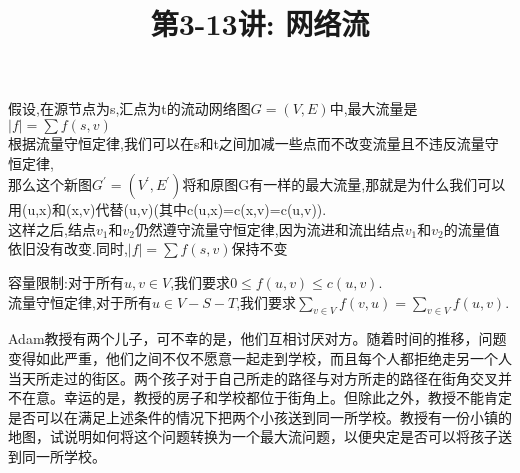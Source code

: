 \documentclass[a4paper, justified]{tufte-handout}
\title{第3-13讲: 网络流}
\date{\zhtoday} %
\begin{document}
\maketitle
\noplagiarism %
\begin{abstract}
\end{abstract}
\beginrequired

\begin{problem}[TC 26.1-1]
\end{problem}

\begin{solution}
  假设,在源节点为s,汇点为t的流动网络图$G=(V,E)$中,最大流量是$|f|=\sum f(s,v)$\\

  根据流量守恒定律,我们可以在s和t之间加减一些点而不改变流量且不违反流量守恒定律,\\
  那么这个新图$G^{'}=(V^{'},E^{'})$将和原图G有一样的最大流量,那就是为什么我们可以用(u,x)和(x,v)代替(u,v)(其中c(u,x)=c(x,v)=c(u,v)).\\
  这样之后,结点$v_1$和$v_2$仍然遵守流量守恒定律,因为流进和流出结点$v_1$和$v_2$的流量值依旧没有改变.同时,$|f|=\sum f(s,v)$保持不变\\
\end{solution}

\begin{problem}[TC 26.1-2]
\end{problem}

\begin{solution}
  容量限制:对于所有$u,v\in V$,我们要求$0\leq f(u,v) \leq c(u,v)$.\\
  流量守恒定律,对于所有$u\in V-S-T$,我们要求$\sum_{v\in V}f(v,u)=\sum_{v\in V}f(u,v)$.
\end{solution}

\begin{problem}[TC 26.1-6]
Adam教授有两个儿子，可不幸的是，他们互相讨厌对方。随着时间的推移，问题变得如此严重，他们之间不仅不愿意一起走到学校，而且每个人都拒绝走另一个人当天所走过的街区。两个孩子对于自己所走的路径与对方所走的路径在街角交叉并不在意。幸运的是，教授的房子和学校都位于街角上。但除此之外，教授不能肯定是否可以在满足上述条件的情况下把两个小孩送到同一所学校。教授有一份小镇的地图，试说明如何将这个问题转换为一个最大流问题，以便央定是否可以将孩子送到同一所学校。
\end{problem}
\end{document}
